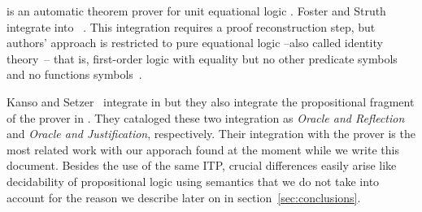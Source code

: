 \documentclass[main.tex]{subfiles}
\begin{document}


 is an automatic theorem prover for unit equational
logic \cite{hillenbrand1997}.
Foster and Struth~\cite{foster2011integrating} integrate  into
\Agda~\cite{agdateam}. This integration requires a proof
reconstruction step, but authors' approach is restricted to pure
equational logic --also called identity theory~\cite{humberstone2011}--
that is, first-order logic with equality but no other predicate symbols
and no functions symbols~\cite{appel1959}.

Kanso and Setzer~\cite{kanso2016light} integrate  in \Agda
but they also integrate the propositional fragment of the  prover in
\cite{Kanso2012}. They cataloged these two integration as
\emph{Oracle and Reflection} and \emph{Oracle and Justification}, respectively.
Their integration with the  prover is the most related work with our
apporach found at the moment while we write this document. Besides the use
of the same ITP, crucial differences easily arise like decidability of
propositional logic using semantics that we do not take into account for the
reason we describe later on in section~\ref{sec:conclusions}.
\end{document}
